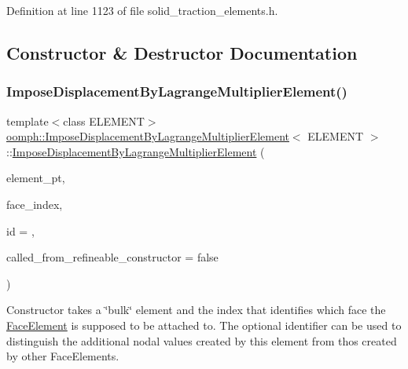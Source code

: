Definition at line 1123 of file solid\+\_\+traction\+\_\+elements.\+h.



\subsection{Constructor \& Destructor Documentation}
\mbox{\label{classoomph_1_1ImposeDisplacementByLagrangeMultiplierElement_aceac32bea480d5da84d225c023bf724c}} 
\subsubsection{\texorpdfstring{Impose\+Displacement\+By\+Lagrange\+Multiplier\+Element()}{ImposeDisplacementByLagrangeMultiplierElement()}}
{\footnotesize\ttfamily template$<$class E\+L\+E\+M\+E\+NT$>$ \\
\hyperlink{classoomph_1_1ImposeDisplacementByLagrangeMultiplierElement}{oomph\+::\+Impose\+Displacement\+By\+Lagrange\+Multiplier\+Element}$<$ E\+L\+E\+M\+E\+NT $>$\+::\hyperlink{classoomph_1_1ImposeDisplacementByLagrangeMultiplierElement}{Impose\+Displacement\+By\+Lagrange\+Multiplier\+Element} (\begin{DoxyParamCaption}\item[{\hyperlink{classoomph_1_1FiniteElement}{Finite\+Element} $\ast$const \&}]{element\+\_\+pt,  }\item[{const int \&}]{face\+\_\+index,  }\item[{const unsigned \&}]{id = {},  }\item[{const bool \&}]{called\+\_\+from\+\_\+refineable\+\_\+constructor = {\ttfamily false} }\end{DoxyParamCaption})\hspace{0.3cm}{\ttfamily [inline]}}



Constructor takes a \char`\"{}bulk\char`\"{} element and the index that identifies which face the \hyperlink{classoomph_1_1FaceElement}{Face\+Element} is supposed to be attached to. The optional identifier can be used to distinguish the additional nodal values created by this element from thos created by other Face\+Elements. 




